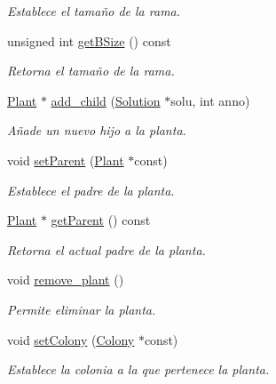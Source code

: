 \begin{DoxyCompactItemize}
\begin{DoxyCompactList}\small\item\em Establece el tamaño de la rama. \end{DoxyCompactList}\item 
\hypertarget{class_plant_a1c8053d6bd28043089ca3106bb1403e8}{unsigned int \hyperlink{class_plant_a1c8053d6bd28043089ca3106bb1403e8}{get\+B\+Size} () const }\label{class_plant_a1c8053d6bd28043089ca3106bb1403e8}

\begin{DoxyCompactList}\small\item\em Retorna el tamaño de la rama. \end{DoxyCompactList}\item 
\hyperlink{class_plant}{Plant} $\ast$ \hyperlink{class_plant_a839a1a741148c611fabde01cfd69bb6a}{add\+\_\+child} (\hyperlink{class_solution}{Solution} $\ast$solu, int anno)
\begin{DoxyCompactList}\small\item\em Añade un nuevo hijo a la planta. \end{DoxyCompactList}\item 
void \hyperlink{class_plant_a167c12394b7edb68155769a375ca8b89}{set\+Parent} (\hyperlink{class_plant}{Plant} $\ast$const)
\begin{DoxyCompactList}\small\item\em Establece el padre de la planta. \end{DoxyCompactList}\item 
\hyperlink{class_plant}{Plant} $\ast$ \hyperlink{class_plant_a26cfa0b80711a8888c42f1ed95640566}{get\+Parent} () const 
\begin{DoxyCompactList}\small\item\em Retorna el actual padre de la planta. \end{DoxyCompactList}\item 
void \hyperlink{class_plant_a785afe98cddf364c286b38aa705f3910}{remove\+\_\+plant} ()
\begin{DoxyCompactList}\small\item\em Permite eliminar la planta. \end{DoxyCompactList}\item 
void \hyperlink{class_plant_a2fd09b66b33406683355d5eeddbbdfaa}{set\+Colony} (\hyperlink{class_colony}{Colony} $\ast$const)
\begin{DoxyCompactList}\small\item\em Establece la colonia a la que pertenece la planta. \end{DoxyCompactList}\item 

\end{DoxyCompactItemize}

